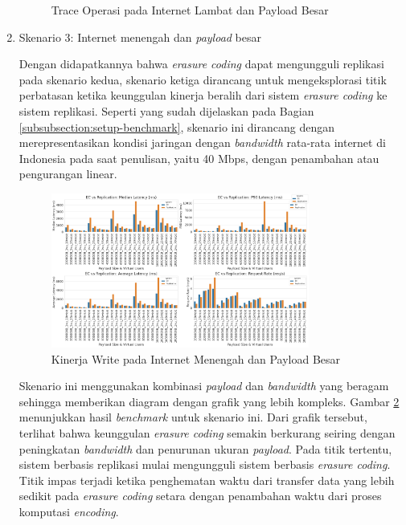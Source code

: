 \begin{enumerate}
\begin{figure}[ht]
      \caption{Trace Operasi pada Internet Lambat dan Payload Besar}
      \label{fig:write-bigload-slownet-trace}
  \end{figure}

  \item Skenario 3: Internet menengah dan \textit{payload} besar
  
  Dengan didapatkannya bahwa \textit{erasure coding} dapat mengungguli replikasi pada skenario kedua, skenario ketiga dirancang untuk mengeksplorasi titik perbatasan ketika keunggulan kinerja beralih dari sistem \textit{erasure coding} ke sistem replikasi. Seperti yang sudah dijelaskan pada Bagian \ref{subsubsection:setup-benchmark}, skenario ini dirancang dengan merepresentasikan kondisi jaringan dengan \textit{bandwidth} rata-rata internet di Indonesia pada saat penulisan, yaitu 40 Mbps, dengan penambahan atau pengurangan linear.
  
  \begin{figure}[ht]
    \centering
    \includegraphics[width=0.8\textwidth]{resources/chapter-4/write_bigload_avgnet.png}

    \caption{Kinerja Write pada Internet Menengah dan Payload Besar}
    \label{fig:write-bigload-avgnet}
  \end{figure}

  Skenario ini menggunakan kombinasi \textit{payload} dan \textit{bandwidth} yang beragam sehingga memberikan diagram dengan grafik yang lebih kompleks. Gambar \ref{fig:write-bigload-avgnet} menunjukkan hasil \textit{benchmark} untuk skenario ini. Dari grafik tersebut, terlihat bahwa keunggulan \textit{erasure coding} semakin berkurang seiring dengan peningkatan \textit{bandwidth} dan penurunan ukuran \textit{payload}. Pada titik tertentu, sistem berbasis replikasi mulai mengungguli sistem berbasis \textit{erasure coding}. Titik impas terjadi ketika penghematan waktu dari transfer data yang lebih sedikit pada \textit{erasure coding} setara dengan penambahan waktu dari proses komputasi \textit{encoding}.


\end{enumerate}
